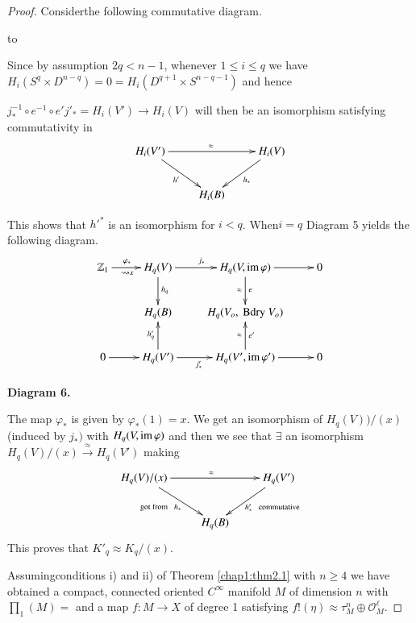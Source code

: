 \begin{proof}
Consider\pageoriginale the following commutative diagram. 
\begin{landscape}
\vbox to
\end{landscape}

Since by assumption $2q<n-1$, whenever $1 \leq i \leq q $ we have $H_i
(S^q \times D^{n-q}) = 0 = H_i (D^{q+1}\times S^{n-q-1}) $ and hence  

$j_*^{-1} \circ e^{-1} \circ e' j'_* = H_i (V') \rightarrow H_i (V) $ will
then be an isomorphism satisfying commutativity in  
\[
\xymatrix{
H_i (V') \ar[rr]^\approx \ar[dr]_{h'} & & H_i (V) \ar[dl]^{h_*}\\
& H_i (B) & 
}
\]

This shows that $h'^* $ is an isomorphism for $i <
q$. When\pageoriginale $i=q$ Diagram 5 yields the following diagram.   
\[
\xymatrix{
\mathbb{Z}_1 \ar[r]^>>>>>{\varphi_*}_>>>>>{\rightsquigarrow x} & H_q (V)
\ar[r]^{j_*}\ar[d]^{h_q} & H_q (V, \im \varphi) \ar[r]
\ar[d]^e_{\approx} & 0\\
& H_q(B) & H_q (V_o, \text{ Bdry } V_o) & \\
0 \ar[r] & H_q(V') \ar[r]_>>>>>{j'_*} \ar[u]^{h'_q} & H_q (V', \im
\varphi') \ar[r] \ar[u]^{\approx}_{e'} & 0
}
\]
\begin{center}
{\bf Diagram 6.}
\end{center}

The map $\varphi_* $ is given by $\varphi_* (1) = x$. We get an
isomorphism of $H_q(V)) / (x)$ (induced by $j_*)$ with $H_q (V, \operatorname{im}
\varphi ) $ and then we see that $\exists $ an isomorphism $H_q (V) /
(x) \xrightarrow{\approx}H_q (V') $ making  
\[
\xymatrix{
H_q(V)/(x) \ar[rr]^\approx \ar[dr]_{\text{got from } \;\; h_*\;\; } & & H_q
(V') \ar[dl]^{\;\; h'_* \;\; 
  \text{ commutative}} \\
& H_q (B) & 
}
\]
 This proves that $K'_q \approx K_q / (x)$. 
 
 Assuming\pageoriginale conditions i) and ii) of Theorem \ref{chap1:thm2.1} with $n
 \geq 4$ we have 
 obtained a compact, connected oriented $C^\infty$ manifold $M$ of
 dimension $n$ with $\prod_1 (M) = $ and a map $f: M \rightarrow X$ of
 degree 1 satisfying $f! (\eta) \approx \tau^n_M \oplus \mathscr{O}^\ell_M$.  
\end{proof}

